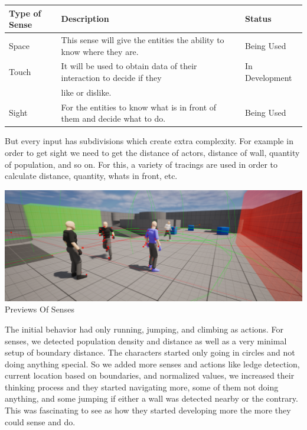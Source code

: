 \documentclass[10pt, letterpaper]{article}
\begin{document}
\begin{Form}
	\begin{center}
		\begin{tabular}{|l|l|l|}
			\hline
			Type of Sense & Description                                                              & Status         \\
			\hline
			Space         & This sense will give the entities the ability to know where they are.    & Being Used     \\
			\hline
			Touch         & It will be used to obtain data of their interaction to decide if they    & In Development \\
			              & like or dislike.                                                         &                \\
			\hline
			Sight         & For the entities to know what is in front of them and decide what to do. & Being Used     \\
			\hline
		\end{tabular}
	\end{center}

	But every input has subdivisions which create extra complexity. For example in order to get sight we need to
	get the distance of actors, distance of wall, quantity of population, and so on. For this, a variety of tracings
	are used in order to calculate distance, quantity, whats in front, etc.

	\begin{center}
		\includegraphics[scale=0.35]{IMG/TracingSense.png} \\
		Previews Of Senses
	\end{center}

	The initial behavior had only running, jumping, and climbing as actions. For senses, we detected population
	density and distance as well as a very minimal setup of boundary distance. The characters started only going
	in circles and not doing anything special. So we added more senses and actions like ledge detection, current location
	based on boundaries, and normalized values, we increased their thinking process and they started navigating more, some
	of them not doing anything, and some jumping if either a wall was detected nearby or the contrary. This was fascinating
	to see as how they started developing more the more they could sense and do.


\end{Form}
\end{document}
